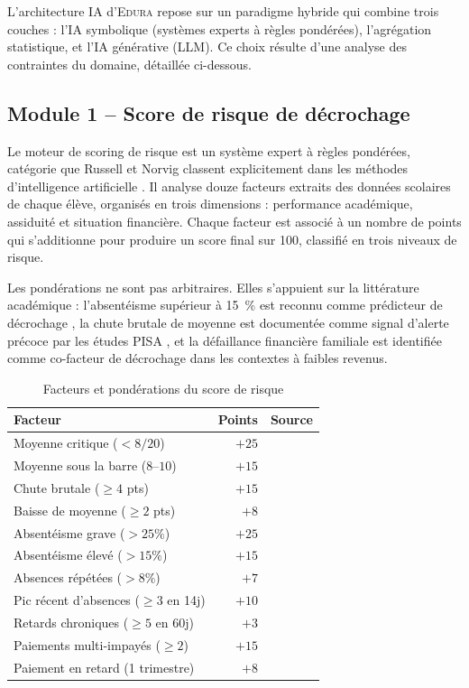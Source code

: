 \documentclass[12pt,a4paper,oneside]{report}
\newcommand{\edura}{\textsc{Edura}}
\begin{document}
L'architecture IA d'\edura{} repose sur un paradigme hybride qui combine trois couches : l'IA symbolique (systèmes experts à règles pondérées), l'agrégation statistique, et l'IA générative (LLM). Ce choix résulte d'une analyse des contraintes du domaine, détaillée ci-dessous.

\subsection{Module 1 -- Score de risque de décrochage}

Le moteur de scoring de risque est un système expert à règles pondérées, catégorie que Russell et Norvig classent explicitement dans les méthodes d'intelligence artificielle \autocite{russell2020artificial}. Il analyse douze facteurs extraits des données scolaires de chaque élève, organisés en trois dimensions : performance académique, assiduité et situation financière. Chaque facteur est associé à un nombre de points qui s'additionne pour produire un score final sur 100, classifié en trois niveaux de risque.

Les pondérations ne sont pas arbitraires. Elles s'appuient sur la littérature académique : l'absentéisme supérieur à 15~\% est reconnu comme prédicteur de décrochage \autocite{balfanz2007preventing}, la chute brutale de moyenne est documentée comme signal d'alerte précoce par les études PISA \autocite{oecd2019pisa}, et la défaillance financière familiale est identifiée comme co-facteur de décrochage dans les contextes à faibles revenus.

\begin{table}[H]
\centering
\caption{Facteurs et pondérations du score de risque}
\label{tab:risque}
\begin{tabular}{lrc}
\toprule
\textbf{Facteur} & \textbf{Points} & \textbf{Source} \\
\midrule
Moyenne critique ($<8/20$) & $+25$ & \\
Moyenne sous la barre ($8$--$10$) & $+15$ & \autocite{oecd2019pisa} \\
Chute brutale ($\geq 4$ pts) & $+15$ & \\
Baisse de moyenne ($\geq 2$ pts) & $+8$ & \\
Absentéisme grave ($>25\%$) & $+25$ & \autocite{balfanz2007preventing} \\
Absentéisme élevé ($>15\%$) & $+15$ & \autocite{balfanz2007preventing} \\
Absences répétées ($>8\%$) & $+7$ & \\
Pic récent d'absences ($\geq 3$ en 14j) & $+10$ & \autocite{mubarak2020prediction} \\
Retards chroniques ($\geq 5$ en 60j) & $+3$ & \\
Paiements multi-impayés ($\geq 2$) & $+15$ & \\
Paiement en retard (1 trimestre) & $+8$ & \\
\bottomrule
\end{tabular}
\end{table}
\end{document}
